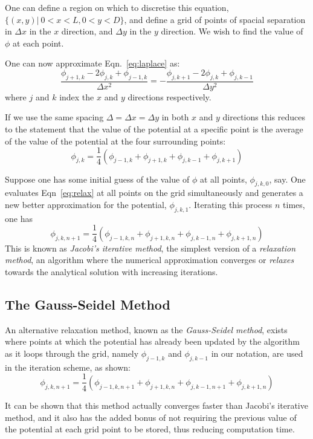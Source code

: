 \documentclass[12pt, a4paper]{article}
\newcommand{\be}{\begin{equation}}
\newcommand{\ee}{\end{equation}}
\begin{document}
One can define a region on which to discretise this equation, $\{(x,y)|\:0<x<L,0<y<D\}$,
and define a grid of points of spacial separation in $\Delta x$ in the $x$ direction,
and $\Delta y$ in the $y$ direction. We wish to find the value of $\phi$ at each point.

One can now approximate Eqn.~\ref{eq:laplace} as:
% 
\be
\frac{\phi_{j+1,k}-2\phi_{j,k}+\phi_{j-1,k}}{\Delta x^2} = - \frac{\phi_{j,k+1}-2\phi_{j,k}+\phi_{j,k-1}}{\Delta y^2}
\ee
%
where $j$ and $k$ index the $x$ and $y$ directions respectively.

If we use the same spacing $\Delta=\Delta x=\Delta y$ in both $x$ and $y$ directions this
reduces to the statement that the value of the potential at a specific point is the
average of the value of the potential at the four surrounding points: 
%
\be
\phi_{j,k}= \frac{1}{4}(\phi_{j-1,k}+\phi_{j+1,k}+\phi_{j,k-1}+\phi_{j,k+1})
\label{eq:relax}
\ee

Suppose one has some initial guess of the value of $\phi$ at all points, $\phi_{j,k,0}$,
say. One evaluates Eqn~\ref{eq:relax} at all points on the grid simultaneously and
generates a new better approximation for the potential, $\phi_{j,k,1}$. Iterating this
process $n$ times, one has
%
\be
\phi_{j,k,n+1}= \frac{1}{4}(\phi_{j-1,k,n}+\phi_{j+1,k,n}+\phi_{j,k-1,n}+\phi_{j,k+1,n})
\ee
%
This is known as \emph{Jacobi's iterative method}, the simplest version of a
\emph{relaxation method}, an algorithm where the numerical approximation converges or
\emph{relaxes} towards the analytical solution with increasing iterations. 

\subsection{The Gauss-Seidel Method}

An alternative relaxation method, known as the \emph{Gauss-Seidel method}, exists where
points at which the potential has already been updated by the algorithm as it loops
through the grid, namely $\phi_{j-1,k}$ and $\phi_{j,k-1}$ in our notation, are used in
the iteration scheme, as shown:
%
\be
\phi_{j,k,n+1}= \frac{1}{4}(\phi_{j-1,k,n+1}+\phi_{j+1,k,n}+\phi_{j,k-1,n+1}+\phi_{j,k+1,n})
\ee

It can be shown that this method actually converges faster than Jacobi's iterative
method, and it also has the added bonus of not requiring the previous value of the 
potential at each grid point to be stored, thus reducing computation time.
\end{document}
